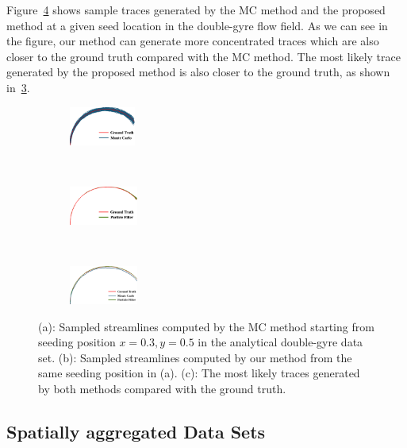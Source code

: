Figure~\ref{case_1} shows sample traces generated by the MC method and the proposed method at a given seed location in the double-gyre flow field. As we can see in the figure, our method can generate more concentrated traces which are also closer to the ground truth compared with the MC method. The most likely trace generated by the proposed method is also closer to the ground truth, as shown in~\ref{case_1_c}.

\begin{figure}[!htb]
  \centering
  \begin{subfigure}[!htb]{0.16\textwidth}
    \centering
    \includegraphics[height=0.5in]{../figures/double_gyre_mc35.eps}
    \caption{}
    \label{case_1_a}
  \end{subfigure}~
  \begin{subfigure}[!htb]{0.16\textwidth}
    \centering
    \includegraphics[height=0.5in]{../figures/double_gyre_smc35.eps}
    \caption{}
    \label{case_1_b}
  \end{subfigure}~
  \begin{subfigure}[!htb]{0.16\textwidth}
    \centering
    \includegraphics[height=0.5in]{../figures/double_gyre_opt35.eps}
    \caption{}
    \label{case_1_c}
  \end{subfigure}
  \caption{(a): Sampled streamlines computed by the MC method starting from seeding position $x=0.3, y=0.5$ in the analytical double-gyre data set. (b): Sampled streamlines computed by our method from the same seeding position in (a). (c): The most likely traces generated by both methods compared with the ground truth.}
  \label{case_1}
\end{figure}

\subsection{Spatially aggregated Data Sets}

